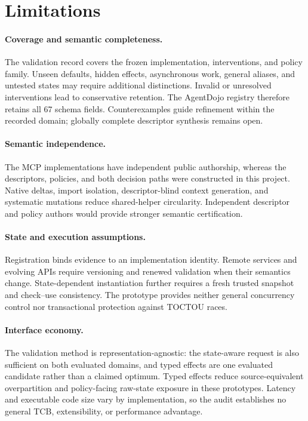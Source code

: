 \section{Limitations}
\label{sec:limitations}

\paragraph{Coverage and semantic completeness.}
The validation record covers the frozen implementation, interventions, and
policy family. Unseen defaults, hidden effects, asynchronous work, general
aliases, and untested states may require additional distinctions. Invalid or
unresolved interventions lead to conservative retention. The AgentDojo registry
therefore retains all 67 schema fields. Counterexamples guide refinement within
the recorded domain; globally complete descriptor synthesis remains open.

\paragraph{Semantic independence.}
The MCP implementations have independent public authorship, whereas the
descriptors, policies, and both decision paths were constructed in this
project. Native deltas, import isolation, descriptor-blind context generation,
and systematic mutations reduce shared-helper circularity. Independent
descriptor and policy authors would provide stronger semantic certification.

\paragraph{State and execution assumptions.}
Registration binds evidence to an implementation identity. Remote services and
evolving APIs require versioning and renewed validation when their semantics
change. State-dependent instantiation further requires a fresh trusted snapshot
and check--use consistency. The prototype provides neither general concurrency
control nor transactional protection against TOCTOU races.

\paragraph{Interface economy.}
The validation method is representation-agnostic: the state-aware request is
also sufficient on both evaluated domains, and typed effects are one evaluated
candidate rather than a claimed optimum. Typed effects reduce
source-equivalent overpartition and policy-facing raw-state exposure in these
prototypes. Latency and executable code size vary by
implementation, so the audit establishes no general TCB, extensibility, or
performance advantage.


